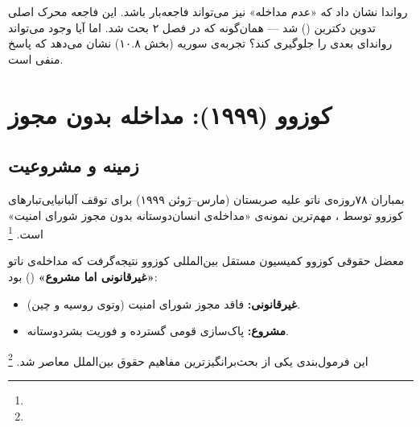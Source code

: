 \begin{tcolorbox}[defbox, title={پارادوکس رواندا}]
رواندا نشان داد که «عدم مداخله» نیز می‌تواند فاجعه‌بار باشد. این فاجعه محرک اصلی تدوین دکترین  () شد — همان‌گونه که در فصل ۲ بحث شد. اما آیا وجود  می‌تواند رواندای بعدی را جلوگیری کند؟ تجربه‌ی سوریه (بخش ۱۰.۸) نشان می‌دهد که پاسخ منفی است.
\end{tcolorbox}

\section{کوزوو (۱۹۹۹): مداخله بدون مجوز}
\label{sec:ch10-kosovo}

\subsection{زمینه و مشروعیت}

بمباران ۷۸روزه‌ی ناتو علیه صربستان (مارس–ژوئن ۱۹۹۹) برای توقف  آلبانیایی‌تبارهای کوزوو توسط ، مهم‌ترین نمونه‌ی «مداخله‌ی انسان‌دوستانه بدون مجوز شورای امنیت» است.%
\footnote{}

\begin{legalNote}{معضل حقوقی کوزوو}
کمیسیون مستقل بین‌المللی کوزوو نتیجه‌گرفت که مداخله‌ی ناتو \textbf{«غیرقانونی اما مشروع»} () بود:
\begin{itemize}[nosep, rightmargin=1em]
  \item \textbf{غیرقانونی:} فاقد مجوز شورای امنیت (وتوی روسیه و چین).
  \item \textbf{مشروع:} پاک‌سازی قومی گسترده و فوریت بشردوستانه.
\end{itemize}
این فرمول‌بندی یکی از بحث‌برانگیزترین مفاهیم حقوق بین‌الملل معاصر شد.%
\footnote{}
\end{legalNote}

